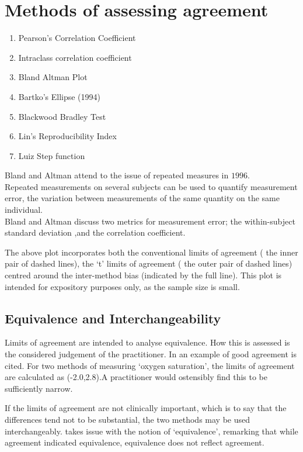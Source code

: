 \documentclass[12pt, a4paper]{report}
\theoremstyle{plain}
\theoremstyle{definition}
\theoremstyle{remark}
\begin{document}
	\section{Methods of assessing agreement}
	
	\begin{enumerate}
		\item Pearson's Correlation Coefficient\item Intraclass
		correlation coefficient \item Bland Altman Plot \item Bartko's
		Ellipse (1994) \item Blackwood Bradley Test \item Lin's
		Reproducibility Index \item Luiz Step function
	\end{enumerate}
	
	Bland and Altman attend to the issue of repeated measures in
	$1996$.
	\\
	Repeated measurements on several subjects can be used to quantify
	measurement error, the variation between measurements of the same
	quantity on the same individual.
	\\
	Bland and Altman discuss two metrics for measurement error; the
	within-subject standard deviation ,and the correlation
	coefficient.
	
	The above plot incorporates both the conventional limits of
	agreement ( the inner pair of dashed lines), the `t' limits of
	agreement ( the outer pair of dashed lines) centred around the
	inter-method bias (indicated by the full line). This plot is
	intended for expository purposes only, as the sample size is
	small.
	
	
	
	
	
	\subsection{Equivalence and Interchangeability}
	Limits of agreement are intended to analyse equivalence. How this
	is assessed is the considered judgement of the practitioner. In
	\citet{BA86} an example of good agreement is cited. For two
	methods of measuring `oxygen saturation', the limits of agreement
	are calculated as (-2.0,2.8).A practitioner would ostensibly find
	this to be sufficiently narrow.
	
	If the limits of agreement are not clinically important, which is
	to say that the differences tend not to be substantial, the two
	methods may be used interchangeably. \citet{DunnSEME} takes issue
	with the notion of `equivalence', remarking that while agreement
	indicated equivalence, equivalence does not reflect agreement.
	
\end{document}
